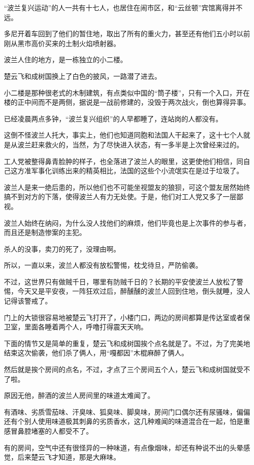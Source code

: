 “波兰复兴运动”的人一共有十七人，也居住在闹市区，和“云丝顿”宾馆离得并不远。

多尼开着车回到了他们的暂住地，取出了所有的重火力，甚至还有他们五小时以前刚从黑市高价买来的土制火焰喷射器。

波兰人住的地方，是一栋独立的小二楼。

楚云飞和成树国换上了白色的披风，一路潜了进去。

小二楼是那种很老式的木制建筑，有点类似中国的“筒子楼”，只有一个入口，开在楼的正中间而不是两侧，据说是一战前修建的，没毁于两次战火，倒也算得异事。

已经凌晨两点多钟，“波兰复兴组织”的人早都睡了，连站岗的人都没有。

这倒不怪波兰人托大，事实上，他们也知道同胞和法国人干起来了，这十七个人就是从波兰赶来救火的，当然，为了尽快进入状态，有一多半是上次曾经来过的。

工人党被整得鼻青脸肿的样子，也全落进了波兰人的眼里，这更使他们相信，同自己这方准军事化训练出来的精英相比，法国的这些个小流氓实在是过于垃圾了。

波兰人是来一绝后患的，所以他们也不可能坐视盟友的狼狈，可这个盟友居然始终搞不到对方的下落，使得波兰人有力无处使。于是，他们对工人党又多了一层鄙视。

波兰人始终在纳闷，为什么没人找他们的麻烦，他们毕竟也是上次事件的参与者，而且还是制造惨案的主犯。

杀人的没事，卖刀的死了，没理由啊。

所以，一直以来，波兰人都没有放松警惕，枕戈待旦，严防偷袭。

不过，这世界只有做贼千日，哪里有防贼千日的？长期的平安使波兰人放松了警惕，今天又是平安夜，一阵狂欢过后，醉醺醺的波兰人回到住地，倒头就睡，没人记得该警戒了。

门上的大锁很容易地被楚云飞打开了，小楼门口，两边的房间都算是传达室或者保卫室，里面各睡着两个人，呼噜打得震天天响。

下面的情节又是简单的重复，楚云飞和成树国挨个点名就是了。不过，为了完美地结束这次偷袭，他们杀了俩人，用“嘎都因”木棍麻醉了俩人。

然后就是挨个房间的点名，不过，才点了三个房间五个人，楚云飞和成树国就受不了啦。

原因无他，醉酒的波兰人房间里的味道太难闻了。

有酒味、劣质雪茄味、汗臭味、狐臭味、脚臭味，房间门口偶尔还有尿骚味，偏偏还有个别人使用味道极其刺鼻的劣质香水，这几种难闻的味道混合在一起，怕是重感冒鼻腔堵塞的人都受不了。

有的房间，空气中还有很怪异的一种味道，有点像烟味，却还有种说不出的头晕感觉，后来楚云飞才知道，那是大麻味。

